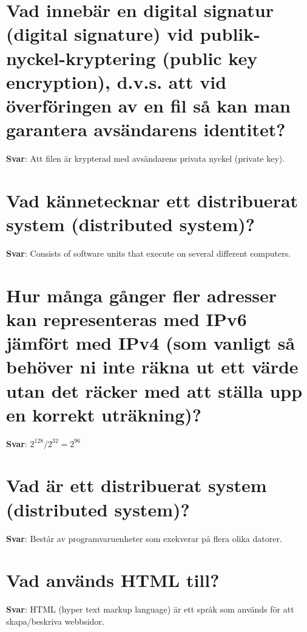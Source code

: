 \documentclass[a4paper,11pt,oneside]{book}
\begin{document}
\begin{sloppypar}
\section{Vad inneb\"ar en digital signatur (digital signature) vid publik-nyckel-kryptering (public key encryption), d.v.s. att vid \"overf\"oringen av en fil s\r{a} kan man garantera avs\"andarens identitet?}

\label{q:156:sa:sv:True}

\textbf{Svar}: Att filen \"ar krypterad med avs\"andarens privata nyckel (private key).



\section{Vad k\"annetecknar ett distribuerat system (distributed system)?}

\label{q:157:sa:sv:True}

\textbf{Svar}: Consists of software units that execute on several different computers.



\section{Hur m\r{a}nga g\r{a}nger fler adresser kan representeras med IPv6 j\"amf\"ort med IPv4 (som vanligt s\r{a} beh\"over ni inte r\"akna ut ett v\"arde utan det r\"acker med att st\"alla upp en korrekt utr\"akning)?}

\label{q:158:sa:sv:True}

\textbf{Svar}: $2^128 / 2^32 = 2^96$



\section{Vad \"ar ett distribuerat system (distributed system)?}

\label{q:159:sa:sv:True}

\textbf{Svar}: Best\r{a}r av programvaruenheter som exekverar p\r{a} flera olika datorer.



\section{Vad anv\"ands HTML till?}

\label{q:160:sa:sv:True}

\textbf{Svar}: HTML (hyper text markup language) \"ar ett spr\r{a}k som anv\"ands f\"or att skapa/beskriva webbsidor.




\end{sloppypar}
\end{document}

